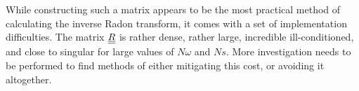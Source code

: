 While constructing such a matrix appears to be the most practical method of calculating the inverse Radon transform, it comes with a set of implementation difficulties.
The matrix ${\underline{\underline{R}}}$ is rather dense, rather large, incredible ill-conditioned, and close to singular for large values of $N\omega$ and $Ns$.
More investigation needs to be performed to find methods of either mitigating this cost, or avoiding it altogether.